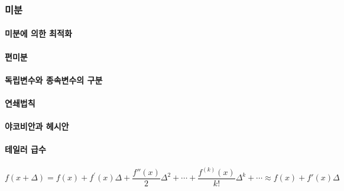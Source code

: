 \documentclass [12pt] {oblivoir}
\let\oldsubsubsection=\subsubsection
\renewcommand{\subsubsection}
{
  \filbreak
  \oldsubsubsection
}
\begin{document}
\vspace{3mm}

\subsubsection{미분}

\paragraph*{미분에 의한 최적화}\mbox{}

\vspace{3mm}

\paragraph*{편미분}\mbox{}

\vspace{3mm}

\paragraph*{독립변수와 종속변수의 구분}\mbox{}

\vspace{3mm}

\paragraph*{연쇄법칙}\mbox{}

\vspace{3mm}

\paragraph*{야코비안과 헤시안}\mbox{}

\vspace{3mm}

\paragraph*{테일러 급수}\mbox{}

\begin{equation} \tag{2.57}
  f(x + \Delta) = f(x) + f^{'}(x)\Delta + \frac{f{''}(x)}{2}\Delta^{2} + \cdots + \frac{f^{(k)}(x)}{k!}\Delta^{k} + \cdots \approx f(x) + f{'}(x)\Delta
\end{equation}

\vspace{3mm}
\end{document}
